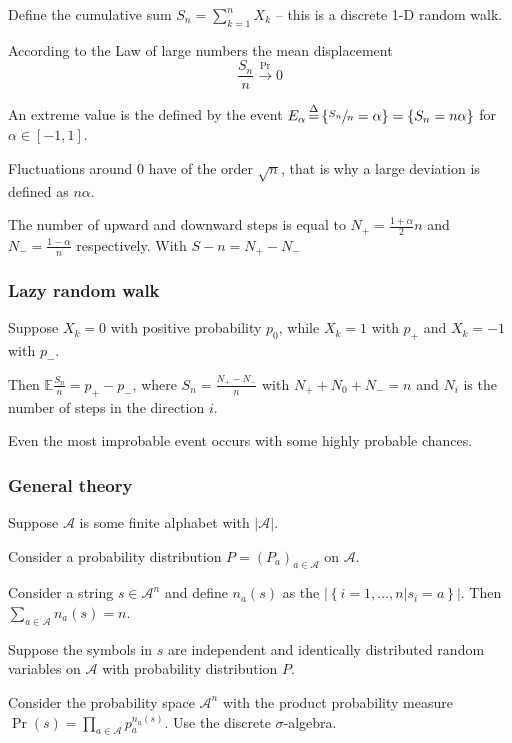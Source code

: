 \documentclass[a4paper]{article}
\newcommand{\obj}[1]{{\left\{ #1 \right \}}}
\newcommand{\clo}[1]{{\left [ #1 \right ]}}
\newcommand{\brac}[1]{{\left ( #1 \right )}}
\newcommand{\induc}[1]{{\left . #1 \right \vert}}
\newcommand{\abs}[1]{{\left | #1 \right |}}
\newcommand{\Acal}{\mathcal{A}}
\newcommand{\Ex}{\mathbb{E}}
\newcommand{\defn}{\mathop{\overset{\Delta}{=}}\nolimits}
\begin{document}
Define the cumulative sum $S_n = \sum_{k=1}^n X_k$ -- this is a discrete 1-D random walk.

According to the Law of large numbers the mean displacement 
\[\frac{S_n}{n} \overset{\Pr}{\to} 0\]

An extreme value is the defined by the event $E_\alpha \defn \obj{ \sfrac{S_n}{n} = \alpha } = \obj{ S_n = n\alpha }$ for $\alpha\in \clo{-1,1}$.

Fluctuations around $0$ have of the order $\sqrt{n}$, that is why a large deviation is defined as $n\alpha$.

The number of upward and downward steps is equal to $N_+ = \frac{1+\alpha}{2}n$ and $N_- = \frac{1-\alpha}{n}$ respectively. With $S-n = N_+-N_-$

\subsubsection{Lazy random walk} %
\label{ssub:lazy_random_walk}

Suppose $X_k = 0$ with positive probability $p_0$, while $X_k = 1$ with $p_+$ and $X_k=-1$ with $p_-$. 

Then $\Ex \frac{S_n}{n} = p_+ - p_-$, where $S_n = \frac{N_+-N_-}{n}$ with $N_++N_0+N_- = n$ and $N_i$ is the number of steps in the direction $i$.

Even the most improbable event occurs with some highly probable chances.


\subsubsection{General theory} %
\label{ssub:general_theory}

Suppose $\Acal$ is some finite alphabet with $\abs{\Acal}$.

Consider a probability distribution $P = \brac{P_a}_{a\in \Acal}$ on $\Acal$.

Consider a string $s\in \Acal^n$ and define $n_a(s)$  as the $\abs{\obj{\induc{i=1,\ldots,n} s_i = a }}$. Then $\sum_{a\in\Acal} n_a(s) = n$.

Suppose the symbols in $s$ are independent and identically distributed random variables on $\Acal$ with probability distribution $P$.

Consider the probability space $\Acal^n$ with the product probability measure $\Pr(s) = \prod_{a\in \Acal} p_a^{n_a(s)}$.
Use the discrete $\sigma$-algebra.
\end{document}
